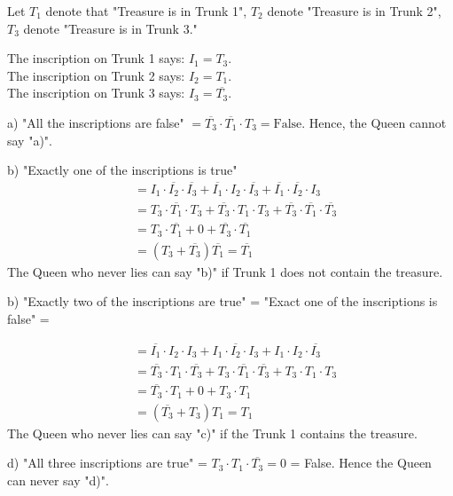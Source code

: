 \begin{sol}
Let $T_1$ denote that "Treasure is in Trunk 1", $T_2$ denote "Treasure is in
Trunk 2", $T_3$ denote "Treasure is in Trunk 3."

\noindent 
The inscription on Trunk 1 says: $I_1 = T_3$.\\
The inscription on Trunk 2 says: $I_2 = T_1$. \\
The inscription on Trunk 3 says: $I_3 = \overline{T_3}$.

\noindent 
a) "All the inscriptions are false" 
$= \overline{T_3} \cdot \overline{T_1} \cdot T_3 = \text{False}$. Hence, the Queen cannot say "a)".

\noindent 
b) "Exactly one of the inscriptions is true"
\begin{align*}
  &= I_1 \cdot \overline{I_2} \cdot \overline{I_3} + 
  \overline{I_1} \cdot {I_2} \cdot \overline{I_3} + 
  \overline{I_1} \cdot \overline{I_2} \cdot {I_3} \\
&= T_3 \cdot \overline{T_1} \cdot {T_3} + \overline{T_3} \cdot T_1 \cdot {T_3} 
+ \overline{T_3} \cdot \overline{T_1} \cdot \overline{T_3}\\
&= T_3 \cdot \overline{T_1} + 0
+ \overline{T_3} \cdot \overline{T_1} \\
&=(T_3 + \overline{T_3}) \overline{T_1} = \overline{T_1}
\end{align*}
The Queen who never lies can say "b)" if Trunk 1 does not contain the treasure.


\noindent 
b) "Exactly two of the inscriptions are true" = "Exact one of the inscriptions is false" =

\begin{align*}
  &= \overline{I_1} \cdot {I_2} \cdot {I_3} + 
  {I_1} \cdot \overline{I_2} \cdot {I_3} + 
  {I_1} \cdot {I_2} \cdot \overline{I_3} \\
  &= \overline{T_3} \cdot {T_1} \cdot \overline{T_3} 
  + {T_3} \cdot \overline{T_1} \cdot \overline{T_3} 
  + {T_3} \cdot {T_1} \cdot {T_3}\\
  &= \overline{T_3} \cdot {T_1} + 0
  + {T_3} \cdot {T_1} \\
  &=(\overline{T_3} + T_3) {T_1} = {T_1}
\end{align*}
The Queen who never lies can say "c)" if the Trunk 1 contains the treasure.


\noindent 
d) "All three inscriptions are true" = $T_3 \cdot T_1 \cdot \overline{T_3} = 0 $ = False. Hence the Queen can never say "d)".


\end{sol}


